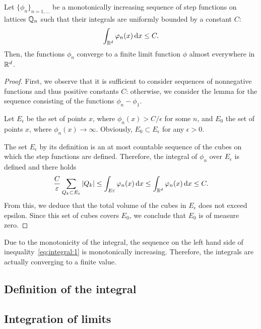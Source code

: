 \begin{lemma}
  \label{lemma:integral:2}
  Let $\{\phi_n\}_{n=1,\dots}$ be a monotonically increasing sequence
  of step functions on lattices $\mathbb Q_n$ such that their integrals are
  uniformly bounded by a constant $C$:
  \begin{gather}
    \label{eq:integral:1}
    \int_{\mathbb R^d} \varphi_n(x) \,\mathrm{d} x \le C.
  \end{gather}
  Then, the functions $\phi_n$ converge to a finite limit function
  $\phi$ almost everywhere in $\mathbb R^d$.
\end{lemma}

\begin{proof}
  First, we observe that it is sufficient to consider sequences of
  nonnegative functions and thus positive constants $C$: otherwise, we
  consider the lemma for the sequence consisting of the functions
  $\phi_n-\phi_1$.

  Let $E_\epsilon$ be the set of points $x$, where $\phi_n(x) >
  C/\epsilon$ for some $n$, and $E_0$ the set of points $x$, where
  $\phi_n(x) \to \infty$. Obviously, $E_0\subset E_\epsilon$ for any
  $\epsilon > 0$.
  
  The set $E_\epsilon$ by its definition is an at most countable
  sequence of the cubes on which the step functions are
  defined. Therefore, the integral of $\phi_n$ over $E_\epsilon$ is
  defined and there holds
  \begin{gather*}
    \frac{C}{\varepsilon}\sum_{Q_{k}\subset E_\varepsilon} |Q_{k}|
    \le \int_{E\varepsilon} \varphi_n(x) \,\mathrm{d} x
    \le \int_{\mathbb R^d} \varphi_n(x) \,\mathrm{d} x \le C.
  \end{gather*}
  From this, we deduce that the total volume of the cubes in
  $E_\epsilon$ does not exceed epsilon. Since this set of cubes
  covers $E_0$, we conclude that $E_0$ is of measure zero.
\end{proof}

\begin{remark}
  \label{remark:integral:1}
  Due to the monotonicity of the integral, the sequence on the left
  hand side of inequality~\eqref{eq:integral:1} is monotonically
  increasing. Therefore, the integrals are actually converging to a
  finite value.
\end{remark}

\subsection{Definition of the integral}




\subsection{Integration of limits}

